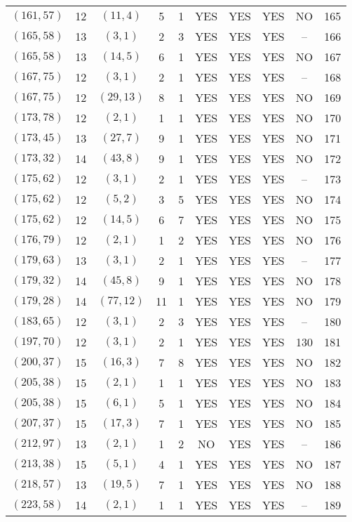 \begin{longtable}{|c|c|c|c|c|c|c|c|c|c|}
$(161, 57)$ & 12 & $(11, 4)$ & 5 & 1 & YES & YES & YES & NO & 165\\
$(165, 58)$ & 13 & $(3, 1)$ & 2 & 3 & YES & YES & YES & -- & 166\\
$(165, 58)$ & 13 & $(14, 5)$ & 6 & 1 & YES & YES & YES & NO & 167\\
$(167, 75)$ & 12 & $(3, 1)$ & 2 & 1 & YES & YES & YES & -- & 168\\
$(167, 75)$ & 12 & $(29, 13)$ & 8 & 1 & YES & YES & YES & NO & 169\\
$(173, 78)$ & 12 & $(2, 1)$ & 1 & 1 & YES & YES & YES & NO & 170\\
$(173, 45)$ & 13 & $(27, 7)$ & 9 & 1 & YES & YES & YES & NO & 171\\
$(173, 32)$ & 14 & $(43, 8)$ & 9 & 1 & YES & YES & YES & NO & 172\\
$(175, 62)$ & 12 & $(3, 1)$ & 2 & 1 & YES & YES & YES & -- & 173\\
$(175, 62)$ & 12 & $(5, 2)$ & 3 & 5 & YES & YES & YES & NO & 174\\
$(175, 62)$ & 12 & $(14, 5)$ & 6 & 7 & YES & YES & YES & NO & 175\\
$(176, 79)$ & 12 & $(2, 1)$ & 1 & 2 & YES & YES & YES & NO & 176\\
$(179, 63)$ & 13 & $(3, 1)$ & 2 & 1 & YES & YES & YES & -- & 177\\
$(179, 32)$ & 14 & $(45, 8)$ & 9 & 1 & YES & YES & YES & NO & 178\\
$(179, 28)$ & 14 & $(77, 12)$ & 11 & 1 & YES & YES & YES & NO & 179\\
$(183, 65)$ & 12 & $(3, 1)$ & 2 & 3 & YES & YES & YES & -- & 180\\
$(197, 70)$ & 12 & $(3, 1)$ & 2 & 1 & YES & YES & YES & 130 & 181\\
$(200, 37)$ & 15 & $(16, 3)$ & 7 & 8 & YES & YES & YES & NO & 182\\
$(205, 38)$ & 15 & $(2, 1)$ & 1 & 1 & YES & YES & YES & NO & 183\\
$(205, 38)$ & 15 & $(6, 1)$ & 5 & 1 & YES & YES & YES & NO & 184\\
$(207, 37)$ & 15 & $(17, 3)$ & 7 & 1 & YES & YES & YES & NO & 185\\
$(212, 97)$ & 13 & $(2, 1)$ & 1 & 2 & NO & YES & YES & -- & 186\\
$(213, 38)$ & 15 & $(5, 1)$ & 4 & 1 & YES & YES & YES & NO & 187\\
$(218, 57)$ & 13 & $(19, 5)$ & 7 & 1 & YES & YES & YES & NO & 188\\
$(223, 58)$ & 14 & $(2, 1)$ & 1 & 1 & YES & YES & YES & -- & 189\\

\end{longtable}
